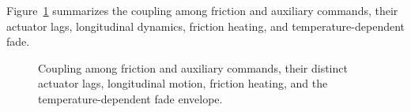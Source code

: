 


Figure~\ref{fig:coupled} summarizes the coupling among friction and auxiliary commands, their actuator lags, longitudinal dynamics, friction heating, and temperature-dependent fade.
\begin{figure}[t]
\centering

\caption{Coupling among friction and auxiliary commands, their distinct actuator lags, longitudinal motion, friction heating, and the temperature-dependent fade envelope.}
\label{fig:coupled}
\end{figure}
